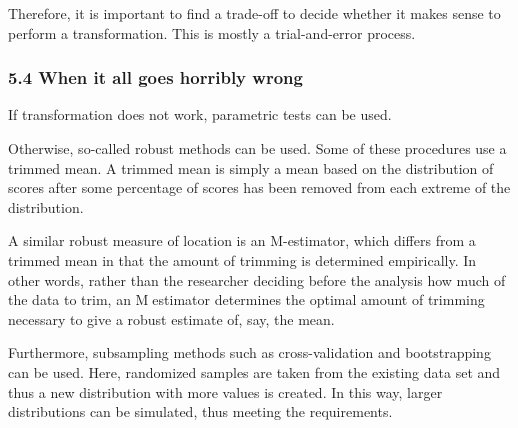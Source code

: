 \documentclass[
]{article}
\begin{document}
Therefore, it is important to find a trade-off to decide whether it
makes sense to perform a transformation. This is mostly a
trial-and-error process.

\hypertarget{when-it-all-goes-horribly-wrong}{%
\subsubsection{5.4 When it all goes horribly
wrong}\label{when-it-all-goes-horribly-wrong}}

If transformation does not work, parametric tests can be used.

Otherwise, so-called robust methods can be used. Some of these
procedures use a trimmed mean. A trimmed mean is simply a mean based on
the distribution of scores after some percentage of scores has been
removed from each extreme of the distribution.

A similar robust measure of location is an M-estimator, which differs
from a trimmed mean in that the amount of trimming is determined
empirically. In other words, rather than the researcher deciding before
the analysis how much of the data to trim, an Mestimator determines the
optimal amount of trimming necessary to give a robust estimate of, say,
the mean.

Furthermore, subsampling methods such as cross-validation and
bootstrapping can be used. Here, randomized samples are taken from the
existing data set and thus a new distribution with more values is
created. In this way, larger distributions can be simulated, thus
meeting the requirements.
\end{document}
